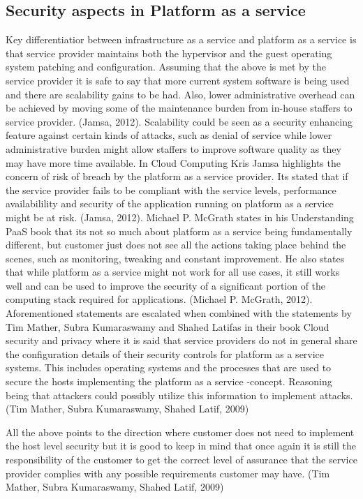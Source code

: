 \documentclass{article}
\begin{document}
\subsection{Security aspects in Platform as a service}
Key differentiatior between infrastructure as a service and platform as a service is that service provider maintains both the hypervisor and the guest operating system patching and configuration.
Assuming that the above is met by the service provider it is safe to say that more current system software is being used and there are scalability gains to be had. Also, lower administrative overhead can be achieved by moving some of the maintenance burden from in-house staffers to service provider. (Jamsa, 2012). Scalability could be seen as a security enhancing feature against certain kinds of attacks, such as denial of service while lower administrative burden might allow staffers to improve software quality as they may have more time available.
In Cloud Computing Kris Jamsa highlights the concern of risk of breach by the platform as a service provider. Its stated that if the service provider fails to be compliant with the service levels, performance availabilility and security of the application running on platform as a service might be at risk. (Jamsa, 2012).
Michael P. McGrath states in his Understanding PaaS book that its not so much about platform as a service being fundamentally different, but customer just does not see all the actions taking place behind the scenes, such as monitoring, tweaking and constant improvement. He also states that while platform as a service might not work for all use cases, it still works well and can be used to improve the security of a significant portion of the computing stack required for applications. (Michael P. McGrath, 2012).
Aforementioned statements are escalated when combined with the statements by Tim Mather, Subra Kumaraswamy and Shahed Latifas in their book Cloud security and privacy where it is said that service providers do not in general share the configuration details of their security controls for platform as a service systems. This includes operating systems and the processes that are used to secure the hosts implementing the platform as a service -concept. Reasoning being that attackers could possibly utilize this information to implement attacks. (Tim Mather, Subra Kumaraswamy, Shahed Latif, 2009)
\par
All the above points to the direction where customer does not need to implement the host level security but it is good to keep in mind that once again it is still the responsibility of the customer to get the correct level of assurance that the service provider complies with any possible requirements customer may have. (Tim Mather, Subra Kumaraswamy, Shahed Latif, 2009)
\end{document}
